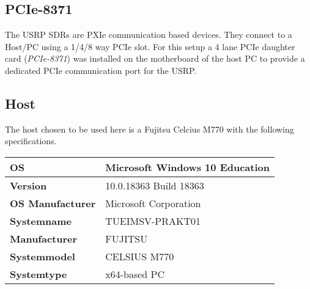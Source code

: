\subsection{PCIe-8371}\label{ssec:PCIe-8371}
The USRP SDRs are PXIe communication based devices. They connect to a Host/PC using a 1/4/8 way PCIe slot. For this setup a 4 lane PCIe daughter card (\emph{PCIe-8371}) was installed on the motherboard of the host PC to provide a dedicated PCIe communication port for the USRP.

\subsection{Host}\label{ssec:host}
The host chosen to be used here is a Fujitsu Celcius M770 with the following specifications.

\begin{table}[htb]
    \begin{center}
        \begin{tabular}{|l|l|}
            \hline
            \textbf{OS}                        & Microsoft Windows 10 Education                                                                                            \\ \hline
            \textbf{Version}                   & 10.0.18363 Build 18363                                                                                                    \\ \hline
            \textbf{OS Manufacturer}           & Microsoft Corporation                                                                                                     \\ \hline
            \textbf{Systemname}                & TUEIMSV-PRAKT01                                                                                                           \\ \hline
            \textbf{Manufacturer}              & FUJITSU                                                                                                                   \\ \hline
            \textbf{Systemmodel}               & CELSIUS M770                                                                                                              \\ \hline
            \textbf{Systemtype}                & x64-based PC                                                                                                              \\ \hline

\end{tabular}
\end{center}
\end{table}
